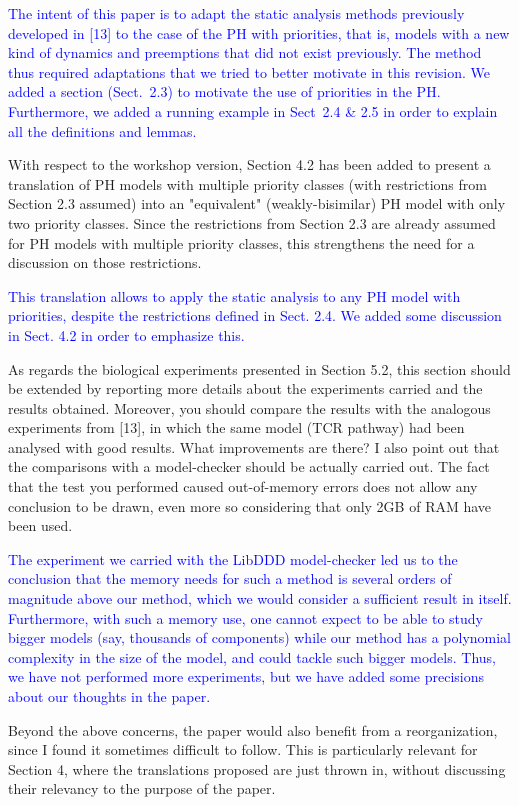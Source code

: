 \documentclass[11pt]{article}
\newcommand{\answer}[1]{\textcolor{blue}{#1}}
\begin{document}
\answer{
The intent of this paper is to adapt the static analysis methods previously developed in [13] to the case of the PH with priorities, that is, models with a new kind of dynamics and preemptions that did not exist previously.
The method thus required adaptations that we tried to better motivate in this revision.
We added a section (Sect.~2.3) to motivate the use of priorities in the PH.
Furthermore, we added a running example in Sect~2.4 \& 2.5 in order to explain all the definitions and lemmas.
}

With respect to the workshop version, Section 4.2 has been added to present a translation of PH models with multiple priority classes (with restrictions from Section 2.3 assumed) into an "equivalent" (weakly-bisimilar) PH model with only two priority classes. Since the restrictions from Section 2.3 are already assumed for PH models with multiple priority classes, this strengthens the need for a discussion on those restrictions.

\answer{
This translation allows to apply the static analysis to any PH model with priorities, despite the restrictions defined in Sect. 2.4.
We added some discussion in Sect. 4.2 in order to emphasize this.
}

As regards the biological experiments presented in Section 5.2, this section should be extended by reporting more details about the experiments carried and the results obtained. Moreover, you should compare the results with the analogous experiments from [13], in which the same model (TCR pathway) had been analysed with good results. What improvements are there?
I also point out that the comparisons with a model-checker should be actually carried out. The fact that the test you performed caused out-of-memory errors does not allow any conclusion to be drawn, even more so considering that only 2GB of RAM have been used.

\answer{
The experiment we carried with the LibDDD model-checker led us to the conclusion that the memory needs for such a method is several orders of magnitude above our method, which we would consider a sufficient result in itself.
Furthermore, with such a memory use, one cannot expect to be able to study bigger models (say, thousands of components) while our method has a polynomial complexity in the size of the model, and could tackle such bigger models.
Thus, we have not performed more experiments,
but we have added some precisions about our thoughts in the paper.
}

Beyond the above concerns, the paper would also benefit from a reorganization, since I found it sometimes difficult to follow. This is particularly relevant for Section 4, where the translations proposed are just thrown in, without discussing their relevancy to the purpose of the paper.
\end{document}

